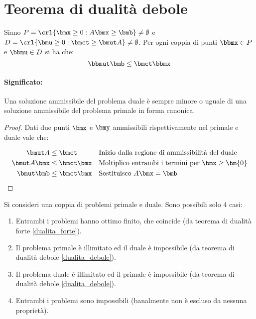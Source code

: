 \documentclass[\main/main.tex]{subfiles}
\begin{document}
\section{Teorema di dualità debole}
\begin{theorem}
  \label{dualita_debole}
  Siano $P=\crl{\bmx \geq 0: A\bmx \geq \bmb} \neq \emptyset$ e $D=\crl{\bmu \geq 0: \bmct \geq \bmut A} \neq \emptyset$. Per ogni coppia di punti $\bbmx \in P$ e $\bbmu \in D$ si ha che:
  \[
    \bbmut \bmb \leq \bmct\bbmx
  \]
  \paragraph*{Significato:} Una soluzione ammissibile del problema duale è sempre minore o uguale di una soluzione ammissibile del problema primale in forma canonica.
\end{theorem}

\begin{proof}
  Dati due punti $\bmx$ e $\bmy$ ammissibili rispettivamente nel primale e duale vale che:

  \begin{align*}
    \bmut A     & \leq \bmct     &  & \text{Inizio dalla regione di ammissibilità del duale}      \\
    \bmut A\bmx & \leq \bmct\bmx &  & \text{Moltiplico entrambi i termini per $\bmx \geq \bm{0}$} \\
    \bmut \bmb  & \leq \bmct\bmx &  & \text{Sostituisco $A\bmx = \bmb$}
  \end{align*}
\end{proof}

\begin{corollary}
  Si consideri una coppia di problemi primale e duale. Sono possibili solo 4 casi:
  \begin{enumerate}
    \item Entrambi i problemi hanno ottimo finito, che coincide (da teorema di dualità forte \ref{dualita_forte}).
    \item Il problema primale è illimitato ed il duale è impossibile (da teorema di dualità debole \ref{dualita_debole}).
    \item Il problema duale è illimitato ed il primale è impossibile (da teorema di dualità debole \ref{dualita_debole}).
    \item Entrambi i problemi sono impossibili (banalmente non è escluso da nessuna proprietà).
  \end{enumerate}
\end{corollary}
\end{document}

